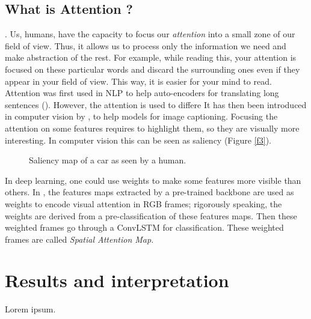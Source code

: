 \documentclass[12pt, a4paper]{report}
\begin{document}
			\subsection{What is Attention ?}
				 \cite{sudhakaran}.
				Us, humans, have the capacity to focus our {\itshape attention} into a small zone of our field of view.
				Thus, it allows us to process only the information we need and make abstraction of the rest.
				For example, while reading this, your attention is focused on these particular words and discard the surrounding ones even if they appear in your field of view.
				This way, it is easier for your mind to read.
				Attention was first used in NLP to help auto-encoders for translating long sentences (\cite{bahdanau}).
				However, the attention is used to differe
				It has then been introduced in computer vision by \cite{xu}, to help models for image captioning.
				Focusing the attention on some features requires to highlight them, so they are visually more interesting.
				In computer vision this can be seen as \gls{saliency} (Figure \ref{f3}).
				\begin{figure}[!h]
					\centering
					\caption{Saliency map of a car as seen by a human.}
				\end{figure}
				In deep learning, one could use weights to make some features more visible than others.
				In \cite{sudhakaran_lanz}, the features maps extracted by a pre-trained backbone are used as weights to encode visual attention in RGB frames; rigorously speaking, the weights are derived from a pre-classification of these features maps.
				Then these weighted frames go through a ConvLSTM for classification.
				These weighted frames are called {\itshape Spatial Attention Map}.
	
		\section{Results and interpretation}
			Lorem ipsum.
\end{document}
